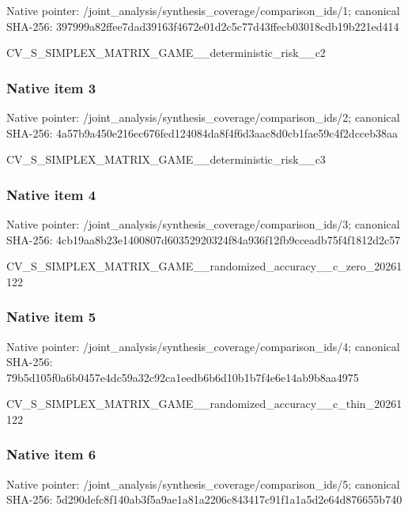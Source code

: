 \documentclass[10pt,a4paper]{article}
\begin{document}
Native pointer: /joint\_analysis/synthesi\allowbreak{}s\_coverage/comparison\_id\allowbreak{}s/1; canonical SHA-256: 397999a82ffee7dad39163f4\allowbreak{}672e01d2c5c77d43ffecb030\allowbreak{}18cdb19b221ed414


CV\_S\_SIMPLEX\_MATRIX\_GAME\allowbreak{}\_\_deterministic\_risk\_\_c2


\subsubsection{Native item 3}


Native pointer: /joint\_analysis/synthesi\allowbreak{}s\_coverage/comparison\_id\allowbreak{}s/2; canonical SHA-256: 4a57b9a450e216ec676fed12\allowbreak{}4084da8f4f6d3aac8d0cb1fa\allowbreak{}e59c4f2dcceb38aa


CV\_S\_SIMPLEX\_MATRIX\_GAME\allowbreak{}\_\_deterministic\_risk\_\_c3


\subsubsection{Native item 4}


Native pointer: /joint\_analysis/synthesi\allowbreak{}s\_coverage/comparison\_id\allowbreak{}s/3; canonical SHA-256: 4cb19aa8b23e1400807d6035\allowbreak{}2920324f84a936f12fb9ccea\allowbreak{}db75f4f1812d2c57


CV\_S\_SIMPLEX\_MATRIX\_GAME\allowbreak{}\_\_randomized\_accuracy\_\_c\allowbreak{}\_zero\_20261122


\subsubsection{Native item 5}


Native pointer: /joint\_analysis/synthesi\allowbreak{}s\_coverage/comparison\_id\allowbreak{}s/4; canonical SHA-256: 79b5d105f0a6b0457e4dc59a\allowbreak{}32c92ca1eedb6b6d10b1b7f4\allowbreak{}e6e14ab9b8aa4975


CV\_S\_SIMPLEX\_MATRIX\_GAME\allowbreak{}\_\_randomized\_accuracy\_\_c\allowbreak{}\_thin\_20261122


\subsubsection{Native item 6}


Native pointer: /joint\_analysis/synthesi\allowbreak{}s\_coverage/comparison\_id\allowbreak{}s/5; canonical SHA-256: 5d290defc8f140ab3f5a9ae1\allowbreak{}a81a2206c843417c91f1a1a5\allowbreak{}d2e64d876655b740
\end{document}
